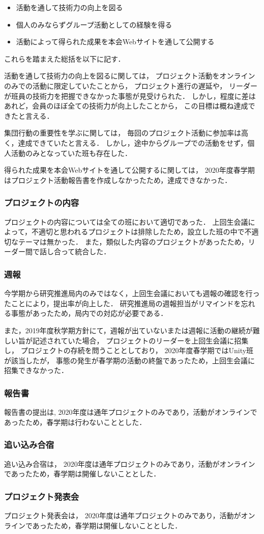 \begin{itemize}
\item 活動を通して技術力の向上を図る
\item 個人のみならずグループ活動としての経験を得る
\item 活動によって得られた成果を本会Webサイトを通して公開する
\end{itemize}

これらを踏まえた総括を以下に記す．

活動を通して技術力の向上を図るに関しては，
プロジェクト活動をオンラインのみでの活動に限定していたことから，
プロジェクト進行の遅延や，
リーダーが班員の技術力を把握できなかった事態が見受けられた．
しかし，程度に差はあれど，会員のほぼ全ての技術力が向上したことから，
この目標は概ね達成できたと言える．

集団行動の重要性を学ぶに関しては，
毎回のプロジェクト活動に参加率は高く，達成できていたと言える．
しかし，途中からグループでの活動をせず，個人活動のみとなっていた班も存在した．

得られた成果を本会Webサイトを通して公開するに関しては，
2020年度春学期はプロジェクト活動報告書を作成しなかったため，達成できなかった．

\subsubsection*{プロジェクトの内容}
プロジェクトの内容については全ての班において適切であった．
上回生会議によって，不適切と思われるプロジェクトは排除したため，設立した班の中で不適切なテーマは無かった．
また，類似した内容のプロジェクトがあったため，リーダー間で話し合って統合した．

\subsubsection*{週報}
今学期から研究推進局内のみではなく，上回生会議においても週報の確認を行ったことにより，提出率が向上した．
研究推進局の週報担当がリマインドを忘れる事態があったため，局内での対応が必要である．

また，2019年度秋学期方針にて，週報が出ていないまたは週報に活動の継続が難しい旨が記述されていた場合，
プロジェクトのリーダーを上回生会議に招集し，
プロジェクトの存続を問うこととしており，
2020年度春学期ではUnity班が該当したが，
事態の発生が春学期の活動の終盤であったため，上回生会議に招集できなかった．

\subsubsection*{報告書}

報告書の提出は,
2020年度は通年プロジェクトのみであり，活動がオンラインであったため，春学期は行わないこととした．

\subsubsection*{追い込み合宿}
追い込み合宿は，
2020年度は通年プロジェクトのみであり，活動がオンラインであったため，春学期は開催しないこととした．

\subsubsection*{プロジェクト発表会}
プロジェクト発表会は，
2020年度は通年プロジェクトのみであり，活動がオンラインであったため，春学期は開催しないこととした．

